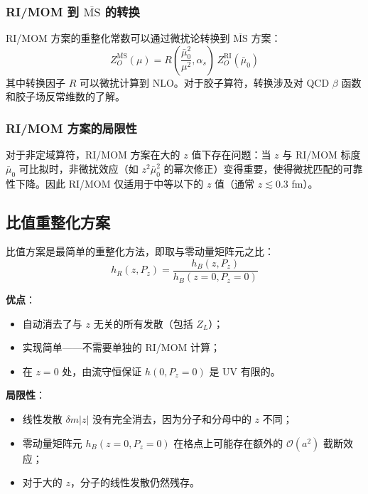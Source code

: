 \documentclass[11pt,a4paper]{ctexart}
\newcommand{\order}[1]{\mathcal{O}(#1)}
\begin{document}
\subsubsection{RI/MOM 到 $\overline{\text{MS}}$ 的转换}

RI/MOM 方案的重整化常数可以通过微扰论转换到 $\overline{\text{MS}}$ 方案：
\begin{equation}
Z_O^{\overline{\text{MS}}}(\mu) = R\!\left( \frac{\bar{\mu}_0^2}{\mu^2}, \alpha_s \right) \,
Z_O^{\text{RI}}(\bar{\mu}_0)
\end{equation}
其中转换因子 $R$ 可以微扰计算到 NLO。对于胶子算符，转换涉及对 QCD $\beta$ 函数和胶子场反常维数的了解。

\subsubsection{RI/MOM 方案的局限性}

对于非定域算符，RI/MOM 方案在大的 $z$ 值下存在问题：当 $z$ 与 RI/MOM 标度 $\bar{\mu}_0$ 可比拟时，非微扰效应（如 $z^2 \bar{\mu}_0^2$ 的幂次修正）变得重要，使得微扰匹配的可靠性下降。因此 RI/MOM 仅适用于中等以下的 $z$ 值（通常 $z \lesssim 0.3$ fm）。

\subsection{比值重整化方案}

比值方案是最简单的重整化方法，即取与零动量矩阵元之比：
\begin{equation}\label{eq:ratio_scheme}
h_R(z, P_z) = \frac{h_B(z, P_z)}{h_B(z=0, P_z=0)}
\end{equation}

\textbf{优点}：
\begin{itemize}
  \item 自动消去了与 $z$ 无关的所有发散（包括 $Z_L$）；
  \item 实现简单——不需要单独的 RI/MOM 计算；
  \item 在 $z=0$ 处，由流守恒保证 $h(0, P_z=0)$ 是 UV 有限的。
\end{itemize}

\textbf{局限性}：
\begin{itemize}
  \item 线性发散 $\delta m |z|$ 没有完全消去，因为分子和分母中的 $z$ 不同；
  \item 零动量矩阵元 $h_B(z=0, P_z=0)$ 在格点上可能存在额外的 $\order{a^2}$ 截断效应；
  \item 对于大的 $z$，分子的线性发散仍然残存。
\end{itemize}
\end{document}
